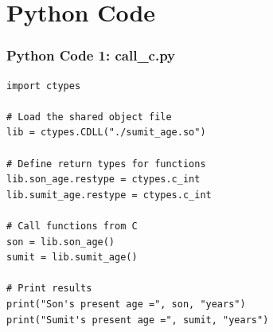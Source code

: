 \documentclass{beamer}
\theoremstyle{remark}
\numberwithin{equation}{section}
\begin{document}
\section{Python Code}
\begin{frame}[fragile]
\frametitle{Python Code 1: call\_c.py}
\begin{lstlisting}
import ctypes

# Load the shared object file
lib = ctypes.CDLL("./sumit_age.so")

# Define return types for functions
lib.son_age.restype = ctypes.c_int
lib.sumit_age.restype = ctypes.c_int

# Call functions from C
son = lib.son_age()
sumit = lib.sumit_age()

# Print results
print("Son's present age =", son, "years")
print("Sumit's present age =", sumit, "years")

\end{lstlisting}
\end{frame}
\end{document}
